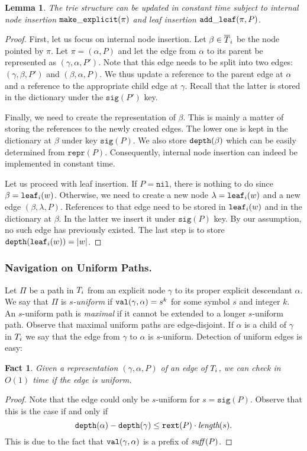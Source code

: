 \documentclass[a4paper]{article}
\newtheorem{lemma}[theorem]{Lemma}
\newtheorem{fact}[theorem]{Fact}
\theoremstyle{remark}
\newcommand{\slength}{\textit{length}}
\newcommand{\itrepr}{\mathtt{repr}}
\newcommand{\itnil}{\mathtt{nil}}
\newcommand{\itsig}{\mathtt{sig}}
\newcommand{\itrext}{\mathtt{rext}}
\begin{document}
\begin{lemma}\label{lem:structure}
The trie structure can be updated in constant time subject to internal node insertion $\mathtt{make\_explicit}(\pi)$ and leaf insertion $\mathtt{add\_leaf}(\pi,P)$.
\end{lemma}
\begin{proof}
First, let us focus on internal node insertion. Let $\beta\in\overline{T}_i$ be the node pointed by $\pi$.
Let $\pi = (\alpha,P)$ and let the edge from $\alpha$ to its parent be represented as $(\gamma,\alpha,P')$.
Note that this edge needs to be split into two edges: $(\gamma,\beta,P')$ and $(\beta,\alpha,P)$.
We thus update a reference to the parent edge at $\alpha$
and a reference to the appropriate child edge at $\gamma$.
Recall that the latter is stored in the dictionary under the $\itsig(P')$ key.

Finally, we need to create the representation of $\beta$.
This is mainly a matter of storing the references to the newly created edges.
The lower one is kept in the dictionary at $\beta$ under key $\itsig(P)$.
We also store $\mathtt{depth}(\beta)$ which can be easily determined from $\itrepr(P)$.
Consequently, internal node insertion can indeed be implemented in constant time.

Let us proceed with leaf insertion. If $P=\itnil$, there is nothing to do since $\beta=\mathtt{leaf}_i(w)$.
Otherwise, we need to create a new node $\lambda=\mathtt{leaf}_i(w)$ and a new edge $(\beta,\lambda,P)$.
References to that edge need to be stored in $\mathtt{leaf}_i(w)$ and in the dictionary at $\beta$.
In the latter we insert it under $\itsig(P)$ key. By our assumption,
no such edge has previously existed. The last step is to store $\mathtt{depth}(\mathtt{leaf}_i(w))=|w|$.
\end{proof}


\newcommand{\tpath}{\mathtt{path}}
\subsubsection{Navigation on Uniform Paths.}
Let $\Pi$ be a path in $T_i$ from an explicit node $\gamma$ to its proper explicit descendant $\alpha$.
We say that $\Pi$ is \emph{$s$-uniform} if $\mathtt{val}(\gamma,\alpha)=s^k$ for some symbol $s$ and integer $k$.
An $s$-uniform path is \emph{maximal} if it cannot be extended to a longer $s$-uniform path.
Observe that maximal uniform paths are edge-disjoint.
If $\alpha$ is a child of $\gamma$ in $T_i$ we say that the edge from $\gamma$ to $\alpha$ is $s$-uniform.
Detection of uniform edges is easy:
\begin{fact}\label{fct:unicheck}
Given a representation $(\gamma,\alpha,P)$ of an edge of $T_i$, we can check in $O(1)$ time if
the edge is uniform.
\end{fact}
\begin{proof}
Note that the edge could only be $s$-uniform for $s=\itsig(P)$.
Observe that this is the case if and only if
$$\tdepth(\alpha)-\tdepth(\gamma) \le \itrext(P)\cdot \slength(s).$$
This is due to the fact that $\mathtt{val}(\gamma,\alpha)$ is a prefix of $\mathit{suff}(P)$.
\end{proof}
\end{document}
